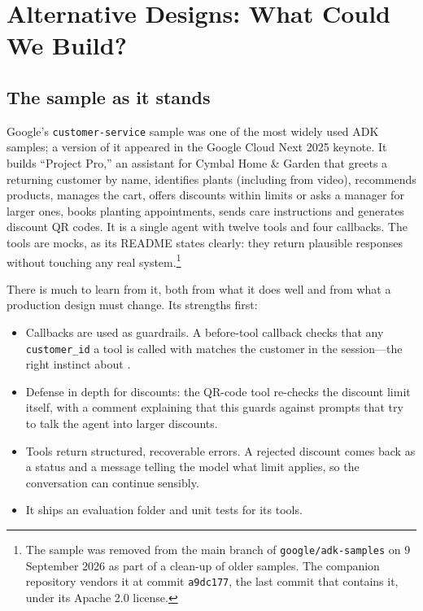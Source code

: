 
\section{Alternative Designs: What Could We Build?}
\label{sec:support-designs}

\subsection{The sample as it stands}

Google's \texttt{customer-service} sample was one of the most widely used ADK samples; a version of it appeared in the Google Cloud Next 2025 keynote. It builds ``Project Pro,'' an assistant for Cymbal Home \& Garden that greets a returning customer by name, identifies plants (including from video), recommends products, manages the cart, offers discounts within limits or asks a manager for larger ones, books planting appointments, sends care instructions and generates discount QR codes. It is a single agent with twelve tools and four callbacks. The tools are mocks, as its README states clearly: they return plausible responses without touching any real system.\footnote{The sample was removed from the main branch of \texttt{google/adk-samples} on 9 September 2026 as part of a clean-up of older samples. The companion repository vendors it at commit \texttt{a9dc177}, the last commit that contains it, under its Apache 2.0 license.}

There is much to learn from it, both from what it does well and from what a production design must change. Its strengths first:
\begin{itemize}[itemsep=1pt]
  \item Callbacks are used as guardrails. A before-tool callback checks that any \texttt{customer\_id} a tool is called with matches the customer in the session---the right instinct about .
  \item Defense in depth for discounts: the QR-code tool re-checks the discount limit itself, with a comment explaining that this guards against prompts that try to talk the agent into larger discounts.
  \item Tools return structured, recoverable errors. A rejected discount comes back as a status and a message telling the model what limit applies, so the conversation can continue sensibly.
  \item It ships an evaluation folder and unit tests for its tools.
\end{itemize}

